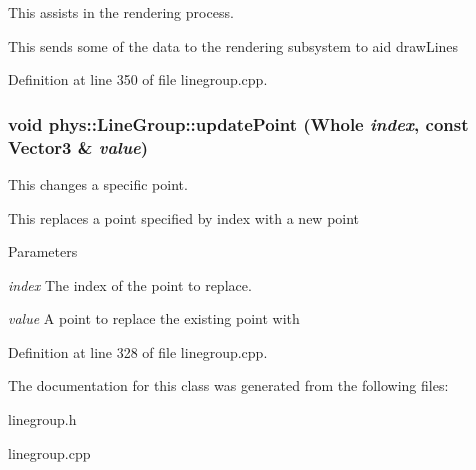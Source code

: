 This assists in the rendering process. 

This sends some of the data to the rendering subsystem to aid drawLines 

Definition at line 350 of file linegroup.cpp.

\hypertarget{classphys_1_1LineGroup_a3d98d0eb4fd15ac136d4649913dd80c8}{
\subsubsection[{updatePoint}]{\setlength{\rightskip}{0pt plus 5cm}void phys::LineGroup::updatePoint ({\bf Whole} {\em index}, \/  const {\bf Vector3} \& {\em value})}}
\label{db/ddb/classphys_1_1LineGroup_a3d98d0eb4fd15ac136d4649913dd80c8}


This changes a specific point. 

This replaces a point specified by index with a new point 
\begin{DoxyParams}{Parameters}
\item[{\em index}]The index of the point to replace. \item[{\em value}]A point to replace the existing point with \end{DoxyParams}


Definition at line 328 of file linegroup.cpp.



The documentation for this class was generated from the following files:\begin{DoxyCompactItemize}
\item 
linegroup.h\item 
linegroup.cpp\end{DoxyCompactItemize}
